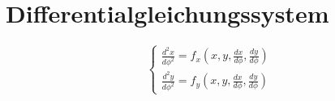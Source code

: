 \section{Differentialgleichungssystem}
\[
\begin{cases}
\frac{d^2x}{d\phi^2} = f_x\left(x,y,\frac{dx}{d\phi},\frac{dy}{d\phi}\right) \\
\frac{d^2y}{d\phi^2} = f_y\left(x,y,\frac{dx}{d\phi},\frac{dy}{d\phi}\right)
\end{cases}
\]